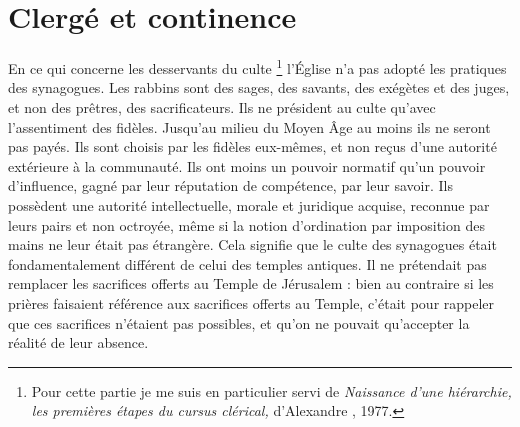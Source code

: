 \section{Clergé et continence}

 En ce qui concerne les desservants du culte%
\footnote{Pour cette partie je me suis en particulier servi de \emph{Naissance d'une hiérarchie, les premières étapes du cursus clérical,} d'Alexandre , 1977.}
l'Église n'a pas adopté les pratiques des synagogues. Les rabbins sont des sages, des savants, des exégètes et des juges, et non des prêtres, des sacrificateurs. Ils ne président au culte qu'avec l'assentiment des fidèles. Jusqu'au milieu du Moyen Âge au moins ils ne seront pas payés. Ils sont choisis par les fidèles eux-mêmes, et non reçus d'une autorité extérieure à la communauté. Ils ont moins un pouvoir normatif qu'un pouvoir d'influence, gagné par leur réputation de compétence, par leur savoir. Ils possèdent une autorité intellectuelle, morale et juridique acquise, reconnue par leurs pairs et non octroyée, même si la notion d'ordination par imposition des mains ne leur était pas étrangère. Cela signifie que le culte des synagogues était fondamentalement différent de celui des temples antiques. Il ne prétendait pas remplacer les sacrifices offerts au Temple de Jérusalem : bien au contraire si les prières faisaient référence aux sacrifices offerts au Temple, c'était pour rappeler que ces sacrifices n'étaient pas possibles, et qu'on ne pouvait qu'accepter la réalité de leur absence. 

